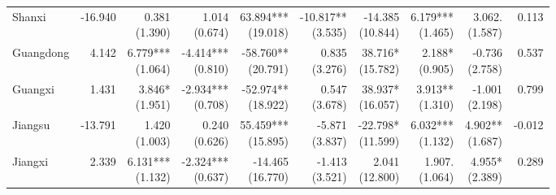 \documentclass[12pt]{article}
\begin{document}
\begin{landscape}
\begin{small}
\begin{longtable}{lrrrrrrrrr}
    Shanxi & -16.940 & \makecell[r]{0.381\\(1.390)} & \makecell[r]{1.014\\(0.674)} & \makecell[r]{63.894***\\(19.018)} & \makecell[r]{-10.817**\\(3.535)} & \makecell[r]{-14.385\\(10.844)} & \makecell[r]{6.179***\\(1.465)} & \makecell[r]{3.062.\\(1.587)} & 0.113 \\
    Guangdong & 4.142 & \makecell[r]{6.779***\\(1.064)} & \makecell[r]{-4.414***\\(0.810)} & \makecell[r]{-58.760**\\(20.791)} & \makecell[r]{0.835\\(3.276)} & \makecell[r]{38.716*\\(15.782)} & \makecell[r]{2.188*\\(0.905)} & \makecell[r]{-0.736\\(2.758)} & 0.537 \\
    Guangxi & 1.431 & \makecell[r]{3.846*\\(1.951)} & \makecell[r]{-2.934***\\(0.708)} & \makecell[r]{-52.974**\\(18.922)} & \makecell[r]{0.547\\(3.678)} & \makecell[r]{38.937*\\(16.057)} & \makecell[r]{3.913**\\(1.310)} & \makecell[r]{-1.001\\(2.198)} & 0.799 \\
    Jiangsu & -13.791 & \makecell[r]{1.420\\(1.003)} & \makecell[r]{0.240\\(0.626)} & \makecell[r]{55.459***\\(15.895)} & \makecell[r]{-5.871\\(3.837)} & \makecell[r]{-22.798*\\(11.599)} & \makecell[r]{6.032***\\(1.132)} & \makecell[r]{4.902**\\(1.687)} & -0.012 \\
    Jiangxi & 2.339 & \makecell[r]{6.131***\\(1.132)} & \makecell[r]{-2.324***\\(0.637)} & \makecell[r]{-14.465\\(16.770)} & \makecell[r]{-1.413\\(3.521)} & \makecell[r]{2.041\\(12.800)} & \makecell[r]{1.907.\\(1.064)} & \makecell[r]{4.955*\\(2.389)} & 0.289 \\

\end{longtable}
\end{small}
\end{landscape}
\end{document}
